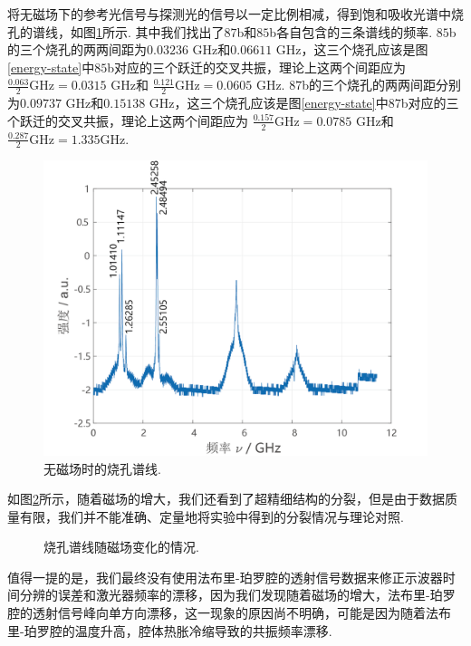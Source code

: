 \documentclass[UTF8,a4paper,10pt]{article}
\begin{document}
将无磁场下的参考光信号与探测光的信号以一定比例相减，得到饱和吸收光谱中烧孔的谱线，如图\ref{holeburning-noField}所示. 其中我们找出了$87$b和$85$b各自包含的三条谱线的频率. $85$b的三个烧孔的两两间距为$0.03236$ GHz和$0.06611$ GHz，这三个烧孔应该是图\ref{energy-state}中$85$b对应的三个跃迁的交叉共振，理论上这两个间距应为 $\frac{0.063}{2}\text{GHz}=0.0315$ GHz和 $\frac{0.121}{2}\text{GHz}=0.0605$ GHz. $87$b的三个烧孔的两两间距分别为$0.09737$ GHz和$0.15138$ GHz，这三个烧孔应该是图\ref{energy-state}中$87$b对应的三个跃迁的交叉共振，理论上这两个间距应为 $\frac{0.157}{2}\text{GHz}=0.0785$ GHz和 $\frac{0.287}{2}\text{GHz}=1.335$GHz.

\begin{figure}[h]
    \centering
    \includegraphics[width=.5\textwidth]{Holeburning-noField.png}
    \caption{无磁场时的烧孔谱线.}
    \label{holeburning-noField}
\end{figure}

如图\ref{B-nu-holeburning}所示，随着磁场的增大，我们还看到了超精细结构的分裂，但是由于数据质量有限，我们并不能准确、定量地将实验中得到的分裂情况与理论对照.

\begin{figure}[ht]
    \centering
    \caption{烧孔谱线随磁场变化的情况.}
    \label{B-nu-holeburning}
\end{figure}

值得一提的是，我们最终没有使用法布里-珀罗腔的透射信号数据来修正示波器时间分辨的误差和激光器频率的漂移，因为我们发现随着磁场的增大，法布里-珀罗腔的透射信号峰向单方向漂移，这一现象的原因尚不明确，可能是因为随着法布里-珀罗腔的温度升高，腔体热胀冷缩导致的共振频率漂移.
\end{document}
